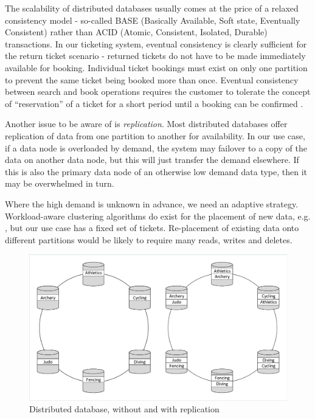 \documentclass{llncs}
\begin{document}
The scalability of distributed databases usually comes at the price of a relaxed consistency model - so-called BASE (Basically Available, Soft state, Eventually Consistent) rather than ACID (Atomic, Consistent, Isolated, Durable) transactions.  In our ticketing system, eventual consistency is clearly sufficient for the return ticket scenario - returned tickets do not have to be made immediately available for booking.  Individual ticket bookings must exist on only one partition to prevent the same ticket being booked more than once.  Eventual consistency between search and book operations requires the customer to tolerate the concept of ``reservation'' of a ticket for a short period until a booking can be confirmed \cite{microservicesdata}\cite{cattell2011scalable}.

Another issue to be aware of is {\itshape replication}.   Most distributed databases offer replication of data from one partition to another for availability.  In our use case, if a data node is overloaded by demand, the system may failover to a copy of the data on another data node, but this will just transfer the demand elsewhere.  If this is also the primary data node of an otherwise low demand data type, then it may be overwhelmed in turn.

Where the high demand is unknown in advance, we need an adaptive strategy.  Workload-aware clustering algorithms do exist for the placement of new data, e.g. \cite{kamal2016workload}, but our use case has a fixed set of tickets.  Re-placement of existing data onto different partitions would be likely to require many reads, writes and deletes.

\begin{figure}
\caption{Distributed database, without and with replication}
\centering
\includegraphics[trim = 5 5 5 5, clip, width=\textwidth]{dbdist}
\end{figure}
\end{document}
